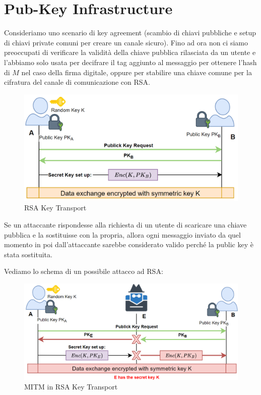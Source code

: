 \section{Pub-Key Infrastructure}
Consideriamo uno scenario di key agreement (scambio di chiavi pubbliche e setup di chiavi private comuni per creare un canale sicuro). Fino ad ora non ci siamo preoccupati di verificare la validità della chiave pubblica rilasciata da un utente e l'abbiamo solo usata per decifrare il tag aggiunto al messaggio per ottenere l'hash di $M$ nel caso della firma digitale, oppure per stabilire una chiave comune per la cifratura del canale di comunicazione con RSA. 
\begin{figure}[ht]
    \centering
    \includegraphics[width=\textwidth]{image/rsakeytrans.png}
    \caption{RSA Key Transport}
    \label{fig:rsakeytrans}
\end{figure}
\begin{remark}Se un attaccante rispondesse alla richiesta di un utente di scaricare una chiave pubblica e la sostituisse con la propria, allora ogni messaggio inviato da quel momento in poi dall'attaccante sarebbe considerato valido perché la public key è stata sostituita. 
\end{remark}
Vediamo lo schema di un possibile attacco ad RSA:
\begin{figure}[ht]
    \centering
    \includegraphics{image/mitmrsa.png}
    \caption{MITM in RSA Key Transport}
    \label{fig:mitmrsa}
\end{figure}\\
